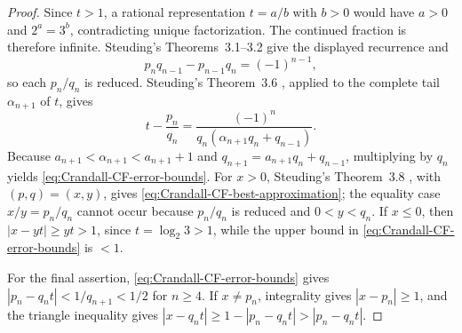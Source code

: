 \begin{proof}
Since $t>1$, a rational representation $t=a/b$ with $b>0$ would have
$a>0$ and $2^a=3^b$, contradicting unique factorization.  The continued
fraction is therefore infinite.  Steuding's Theorems~3.1--3.2
\cite[printed p.~38]{Steuding2005} give the
displayed recurrence and
\[
 p_nq_{n-1}-p_{n-1}q_n=(-1)^{n-1},
\]
so each $p_n/q_n$ is reduced.  Steuding's Theorem~3.6
\cite[printed p.~42]{Steuding2005}, applied to the
complete tail $\alpha_{n+1}$ of $t$, gives
\[
 t-\frac{p_n}{q_n}
 =\frac{(-1)^n}{q_n(\alpha_{n+1}q_n+q_{n-1})}.
\]
Because $a_{n+1}<\alpha_{n+1}<a_{n+1}+1$ and
$q_{n+1}=a_{n+1}q_n+q_{n-1}$, multiplying by $q_n$ yields
\eqref{eq:Crandall-CF-error-bounds}.  For $x>0$, Steuding's
Theorem~3.8 \cite[printed pp.~44--45]{Steuding2005}, with $(p,q)=(x,y)$,
gives \eqref{eq:Crandall-CF-best-approximation};
the equality case $x/y=p_n/q_n$ cannot occur because $p_n/q_n$ is reduced
and $0<y<q_n$.  If $x\leq0$, then $|x-yt|\geq yt>1$, since
$t=\log_2 3>1$, while the upper bound
in \eqref{eq:Crandall-CF-error-bounds} is $<1$.

For the final assertion, \eqref{eq:Crandall-CF-error-bounds} gives
$|p_n-q_nt|<1/q_{n+1}<1/2$ for $n\geq4$.  If $x\ne p_n$, integrality gives
$|x-p_n|\geq1$, and the triangle inequality gives
$|x-q_nt|\geq1-|p_n-q_nt|>|p_n-q_nt|$.
\end{proof}

